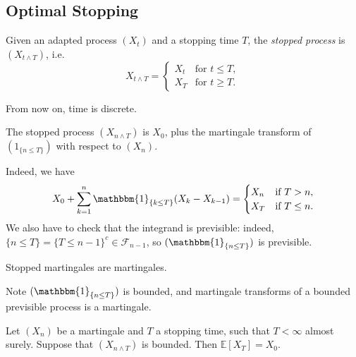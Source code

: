\documentclass[12pt]{article}
\begin{document}

\subsection{Optimal Stopping}
\label{sub:opt_stop}

\begin{definition}
	Given an adapted process $(X_t)$ and a stopping time $T$, the \emph{stopped process} is $(X_{t \wedge T})$, i.e.
	\[
	X_{t \wedge T} =
	\begin{cases}
		X_t & \text{for } t \leq T,\\
		X_T & \text{for } t \geq T.
	\end{cases}
	\]
\end{definition}

From now on, time is discrete.

\begin{proposition}
	The stopped process $(X_{n \wedge T})$ is $X_0$, plus the martingale transform of $(1_{\{n \leq T\}})$ with respect to $(X_n)$.
\end{proposition}

\begin{proofbox}
	Indeed, we have
	\[
		X_0 + \sum_{k = 1}^n \mathbbm{1}_{\{k \leq T\}} (X_k - X_{k-1}) =
		\begin{cases}
			X_n & \text{if } T > n, \\
		X_T &\text{if } T \leq n.
		\end{cases}
	\]
	We also have to check that the integrand is previsible: indeed, $\{n \leq T\} = \{T \leq n-1\}^{c} \in \mathcal{F}_{n-1}$, so $(\mathbbm{1}_{\{n \leq T\}})$ is previsible.
\end{proofbox}

\begin{theorem}
	Stopped martingales are martingales.
\end{theorem}

\begin{proofbox}
	Note $(\mathbbm{1}_{\{n \leq T\}})$ is bounded, and martingale transforms of a bounded previsible process is a martingale.
\end{proofbox}

\begin{theorem}
	Let $(X_n)$ be a martingale and $T$ a stopping time, such that $T < \infty$ almost surely. Suppose that $(X_{n \wedge T})$ is bounded. Then $\mathbb{E}[X_T] = X_0$.
\end{theorem}
\end{document}
